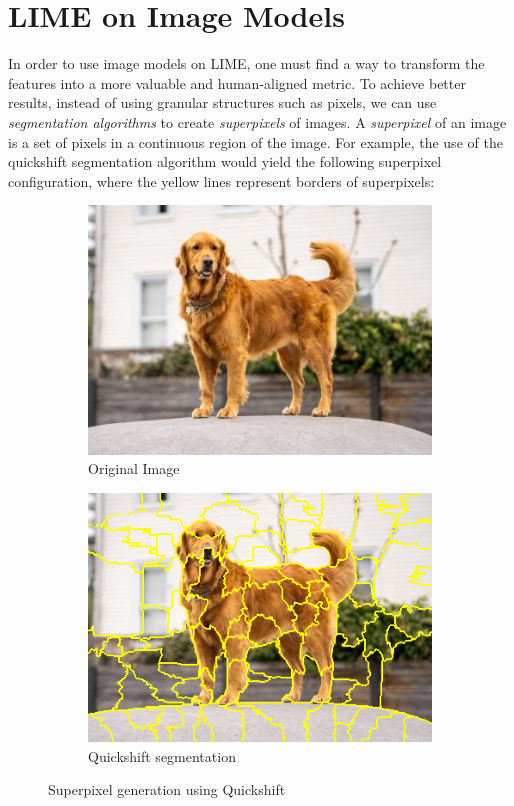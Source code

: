 \section{LIME on Image Models}

In order to use image models on LIME, one must find a way to transform the features into a more valuable and human-aligned metric. 
To achieve better results, instead of using granular structures such as pixels, we can use \emph{segmentation algorithms} to create \emph{superpixels} of images.
A \emph{superpixel} of an image is a set of pixels in a continuous region of the image. 
For example, the use of the quickshift segmentation algorithm would yield the following superpixel configuration, where the yellow lines represent borders of superpixels:

\begin{figure}
    \captionsetup{justification=centering}

    \begin{subfigure}[t]{0.48\textwidth}
        \captionsetup{justification=centering}
        \centering
        \includegraphics[width=.7\linewidth]{figuras/lime/dog.jpg}
        \caption{Original Image}
    \end{subfigure}
    \hfill
    \begin{subfigure}[t]{0.48\textwidth}
        \captionsetup{justification=centering}
        \centering
        \includegraphics[width=.7\linewidth]{figuras/lime/segmentation_dog.png}
        \caption{Quickshift segmentation}
    \end{subfigure}
    \caption{Superpixel generation using Quickshift}
    \label{fig:superpixel_quickshift}
\end{figure}

